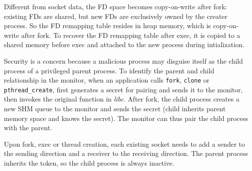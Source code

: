 Different from socket data, the FD space becomes copy-on-write after fork: existing FDs are shared, but new FDs are exclusively owned by the creater process.
So the FD remapping table resides in heap memory, which is copy-on-write after fork.
To recover the FD remapping table after exec, it is copied to a shared memory before exec and attached to the new process during \libipc{} intialization.

Security is a concern because a malicious process may disguise itself as the child process of a privileged parent process.
To identify the parent and child relationship in the monitor, when an application calls \texttt{fork}, \texttt{clone} or \texttt{pthread\_create}, \libipc{} first generates a secret for pairing and sends it to the monitor, then invokes the original function in \emph{libc}.
After fork, the child process creates a new SHM queue to the monitor and sends the secret (child inherits parent memory space and knows the secret).
The monitor can thus pair the child process with the parent.

Upon fork, exec or thread creation, each existing socket needs to add a sender to the sending direction and a receiver to the receiving direction.
The parent process inherits the token, so the child process is always inactive.




